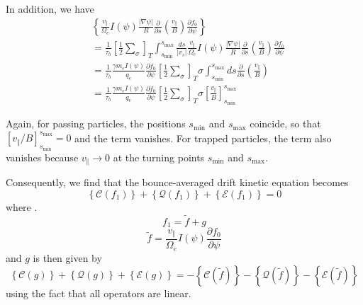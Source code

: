 In addition, we have
\begin{align}
& \left\{  \frac{v_{\Vert}}{\Omega_{e}}I\left(  \psi\right)  \frac{\left|
\nabla\psi\right|  }{R}\frac{\partial}{\partial s}\left(  \frac{v_{\Vert}}%
{B}\right)  \frac{\partial f_{0}}{\partial\psi}\right\} \nonumber\\
& =\frac{1}{\tau_{b}}\left[  \frac{1}{2}\sum_{\sigma}\right]  _{T}%
\int_{s_{\min}}^{s_{\max}}\frac{ds}{\left|  v_{s}\right|  }\frac{v_{\Vert}%
}{\Omega_{e}}I\left(  \psi\right)  \frac{\left|  \nabla\psi\right|  }{R}%
\frac{\partial}{\partial s}\left(  \frac{v_{\Vert}}{B}\right)  \frac{\partial
f_{0}}{\partial\psi}\nonumber\\
& =\frac{1}{\tau_{b}}\frac{\gamma m_{e}I\left(  \psi\right)  }{q_{e}}%
\frac{\partial f_{0}}{\partial\psi}\left[  \frac{1}{2}\sum_{\sigma}\right]
_{T}\sigma\int_{s_{\min}}^{s_{\max}}ds\frac{\partial}{\partial s}\left(
\frac{v_{\Vert}}{B}\right) \nonumber\\
& =\frac{1}{\tau_{b}}\frac{\gamma m_{e}I\left(  \psi\right)  }{q_{e}}%
\frac{\partial f_{0}}{\partial\psi}\left[  \frac{1}{2}\sum_{\sigma}\right]
_{T}\sigma\left[  \frac{v_{\Vert}}{B}\right]  _{s_{\min}}^{s_{\max}}%
\end{align}

Again, for passing particles, the positions $s_{\min}$ and $s_{\max}$
coincide, so that $\left[  v_{\Vert}/B\right]  _{s_{\min}}^{s_{\max}}=0$ and
the term vanishes. For trapped particles, the term also vanishes because
$v_{\Vert}\rightarrow0$ at the turning points $s_{\min}$ and $s_{\max}.$

Consequently, we find that the bounce-averaged drift kinetic equation becomes
\begin{equation}
\left\{  \mathcal{C}\left(  f_{1}\right)  \right\}  +\left\{  \mathcal{Q}%
\left(  f_{1}\right)  \right\}  +\left\{  \mathcal{E}\left(  f_{1}\right)
\right\}  =0\label{DKEeq}%
\end{equation}
where .
\begin{equation}
f_{1}=\widetilde{f}+g\label{f1def}%
\end{equation}%
\begin{equation}
\widetilde{f}=\frac{v_{\Vert}}{\Omega_{e}}I\left(  \psi\right)  \frac{\partial
f_{0}}{\partial\psi}%
\end{equation}
and $g$ is then given by
\begin{equation}
\left\{  \mathcal{C}\left(  g\right)  \right\}  +\left\{  \mathcal{Q}\left(
g\right)  \right\}  +\left\{  \mathcal{E}\left(  g\right)  \right\}
=-\left\{  \mathcal{C}\left(  \widetilde{f}\right)  \right\}  -\left\{
\mathcal{Q}\left(  \widetilde{f}\right)  \right\}  -\left\{  \mathcal{E}%
\left(  \widetilde{f}\right)  \right\}
\end{equation}
using the fact that all operators are linear.
